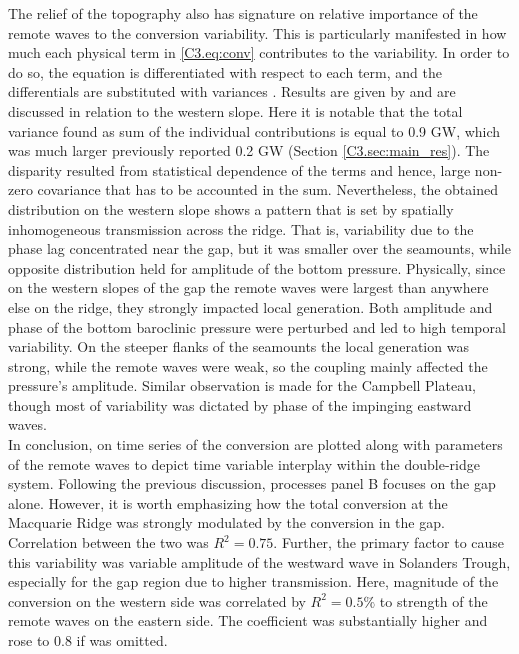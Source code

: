 \documentclass[12pt]{article}
\begin{document}
The relief of the topography also has signature on relative importance of the remote waves to the 
conversion variability. This is particularly manifested in how much each physical term in 
\eqref{C3.eq:conv} contributes to the variability. In order to do so, the equation is 
differentiated with respect to each term, and the differentials are substituted with variances 
\citep{kerry2014impact}. Results are given by  and are discussed in relation 
to the western slope. Here it is notable that the total 
variance found as sum of the individual contributions is equal to 0.9 GW, which was  
much larger previously reported 0.2 GW (Section \ref{C3.sec:main_res}). The disparity resulted 
from statistical dependence of the terms and hence, large non-zero covariance that has to be 
accounted in the sum. Nevertheless, the obtained distribution on the western slope 
shows a pattern that is set by spatially inhomogeneous transmission across the ridge. 
That is, variability due to the phase lag concentrated near the gap, but it was smaller over the 
seamounts, while opposite distribution held for amplitude of the bottom pressure. 
Physically, since on the western slopes of the gap the remote waves were largest than anywhere else 
on the ridge, they strongly impacted local generation. Both amplitude and phase of the bottom 
baroclinic pressure were perturbed and led to high 
temporal variability. On the 
steeper flanks of the seamounts the local generation was strong, while the remote waves were 
weak, so the coupling mainly affected the pressure's amplitude. Similar observation is made for the 
Campbell Plateau, though most of variability was dictated by phase of the impinging eastward 
waves.\\

In conclusion, on  time series of the conversion are plotted along 
with parameters of the remote waves to depict time variable interplay 
within the double-ridge system. Following the previous discussion, processes panel B focuses on the 
gap alone. However, it is worth emphasizing how the total conversion at the Macquarie Ridge 
was strongly modulated by the conversion in the gap. Correlation between the 
two was $R^2 = 0.75$. Further, the primary factor to cause this variability was variable amplitude 
of the westward wave in Solanders Trough, especially for the gap region 
 due to higher transmission. Here, magnitude of the conversion on the 
western side was correlated by $R^2 = 0.5\%$ to strength of the remote waves on the eastern side. 
The coefficient was substantially higher and rose to $0.8$ if  was omitted.\\
\end{document}
